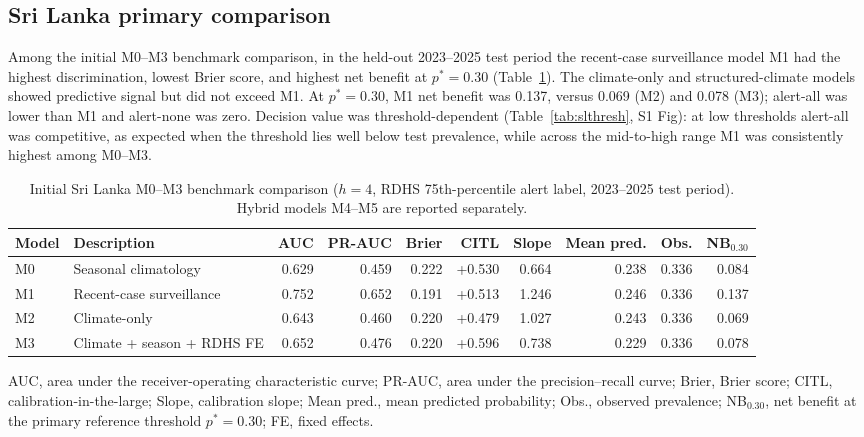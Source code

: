\documentclass[11pt,a4paper]{article}
\begin{document}
\subsection{Sri Lanka primary comparison}
Among the initial M0--M3 benchmark comparison, in the held-out 2023--2025 test period the recent-case surveillance model M1 had the highest discrimination, lowest Brier score, and highest net benefit at $p^*=0.30$ (Table~\ref{tab:slprimary}). The climate-only and structured-climate models showed predictive signal but did not exceed M1. At $p^*=0.30$, M1 net benefit was 0.137, versus 0.069 (M2) and 0.078 (M3); alert-all was lower than M1 and alert-none was zero. Decision value was threshold-dependent (Table~\ref{tab:slthresh}, S1 Fig): at low thresholds alert-all was competitive, as expected when the threshold lies well below test prevalence, while across the mid-to-high range M1 was consistently highest among M0--M3.

\begin{table}[htbp]
\centering
\caption{Initial Sri Lanka M0--M3 benchmark comparison ($h=4$, RDHS 75th-percentile alert label, 2023--2025 test period). Hybrid models M4--M5 are reported separately.}
\label{tab:slprimary}
\begin{threeparttable}\footnotesize
\setlength{\tabcolsep}{3.6pt}
\begin{tabular}{llrrrrrrrr}
\toprule
Model & Description & AUC & PR-AUC & Brier & CITL & Slope & Mean pred. & Obs. & NB$_{0.30}$ \\
\midrule
M0 & Seasonal climatology & 0.629 & 0.459 & 0.222 & +0.530 & 0.664 & 0.238 & 0.336 & 0.084 \\
M1 & Recent-case surveillance & 0.752 & 0.652 & 0.191 & +0.513 & 1.246 & 0.246 & 0.336 & 0.137 \\
M2 & Climate-only & 0.643 & 0.460 & 0.220 & +0.479 & 1.027 & 0.243 & 0.336 & 0.069 \\
M3 & Climate + season + RDHS FE & 0.652 & 0.476 & 0.220 & +0.596 & 0.738 & 0.229 & 0.336 & 0.078 \\
\bottomrule
\end{tabular}
\begin{tablenotes}\footnotesize
\item AUC, area under the receiver-operating characteristic curve; PR-AUC, area under the precision--recall curve; Brier, Brier score; CITL, calibration-in-the-large; Slope, calibration slope; Mean pred., mean predicted probability; Obs., observed prevalence; NB$_{0.30}$, net benefit at the primary reference threshold $p^*=0.30$; FE, fixed effects.
\end{tablenotes}
\end{threeparttable}
\end{table}
\end{document}

